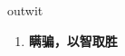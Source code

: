 
\begin{frame}
{\huge outwit}
\begin{center}
\begin{enumerate}\Large
  \item \textbf{瞒骗，以智取胜}
\end{enumerate}
\end{center}
\end{frame}
